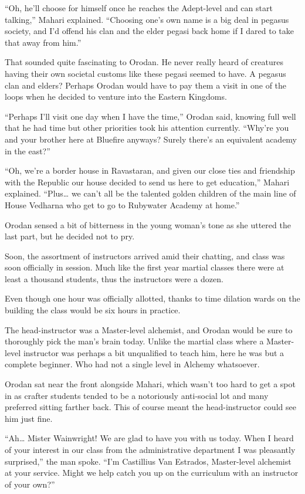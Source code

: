 \documentclass[a4paper,10pt]{book}
\begin{document}
“Oh, he’ll choose for himself once he reaches the Adept-level and can start talking,” Mahari explained. “Choosing one’s own name is a big deal in pegasus society, and I’d offend his clan and the elder pegasi back home if I dared to take that away from him.”\par
That sounded quite fascinating to Orodan. He never really heard of creatures having their own societal customs like these pegasi seemed to have. A pegasus clan and elders? Perhaps Orodan would have to pay them a visit in one of the loops when he decided to venture into the Eastern Kingdoms.\par
“Perhaps I’ll visit one day when I have the time,” Orodan said, knowing full well that he had time but other priorities took his attention currently. “Why’re you and your brother here at Bluefire anyways? Surely there’s an equivalent academy in the east?”\par
“Oh, we’re a border house in Ravastaran, and given our close ties and friendship with the Republic our house decided to send us here to get education,” Mahari explained. “Plus… we can’t all be the talented golden children of the main line of House Vedharna who get to go to Rubywater Academy at home.”\par
Orodan sensed a bit of bitterness in the young woman’s tone as she uttered the last part, but he decided not to pry.\par
Soon, the assortment of instructors arrived amid their chatting, and class was soon officially in session. Much like the first year martial classes there were at least a thousand students, thus the instructors were a dozen.\par
Even though one hour was officially allotted, thanks to time dilation wards on the building the class would be six hours in practice.\par
The head-instructor was a Master-level alchemist, and Orodan would be sure to thoroughly pick the man’s brain today. Unlike the martial class where a Master-level instructor was perhaps a bit unqualified to teach him, here he was but a complete beginner. Who had not a single level in Alchemy whatsoever.\par
Orodan sat near the front alongside Mahari, which wasn’t too hard to get a spot in as crafter students tended to be a notoriously anti-social lot and many preferred sitting farther back. This of course meant the head-instructor could see him just fine.\par
“Ah… Mister Wainwright! We are glad to have you with us today. When I heard of your interest in our class from the administrative department I was pleasantly surprised,” the man spoke. “I’m Castillius Van Estrados, Master-level alchemist at your service. Might we help catch you up on the curriculum with an instructor of your own?”\par
\end{document}
